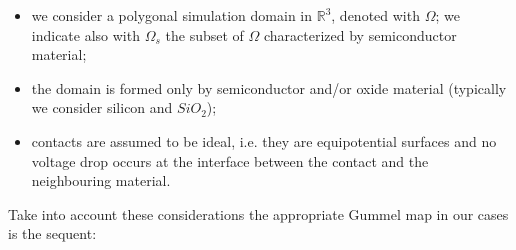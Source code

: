 \begin{itemize}
\item we consider a polygonal simulation domain  in $\mathbb{R}^3$, denoted with $\Omega$; we indicate also with $\Omega_s$ the subset of $\Omega$ characterized by semiconductor material;
\item the domain is formed only by semiconductor and/or oxide material (typically we consider silicon and $SiO_2$);
\item contacts are assumed to be ideal, i.e. they are equipotential surfaces and no voltage drop occurs at the interface between the contact and the neighbouring material.
\end{itemize}
Take into account these considerations the appropriate Gummel map in our cases is the sequent:




